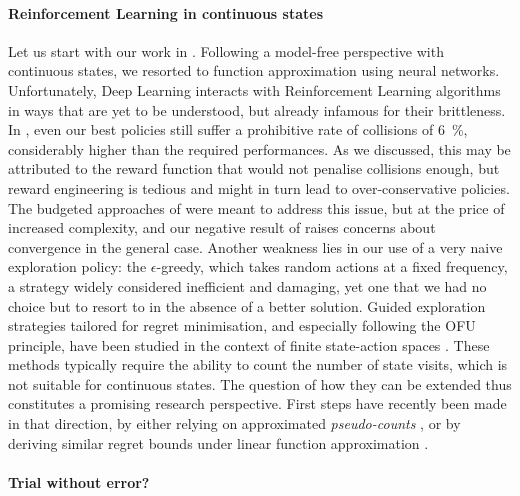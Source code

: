 \paragraph{Reinforcement Learning in continuous states}

Let us start with our work in . Following a model-free perspective with continuous states, we resorted to function approximation using neural networks. Unfortunately, Deep Learning interacts with Reinforcement Learning algorithms in ways that are yet to be understood, but already infamous for their brittleness. In , even our best policies still suffer a prohibitive rate of collisions of \SI{6}{\percent}, considerably higher than the required performances. 
As we discussed, this may be attributed to the reward function that would not penalise collisions enough, but reward engineering is tedious and might in turn lead to over-conservative policies. The budgeted approaches of  were meant to address this issue, but at the price of increased complexity, and our negative result of  raises concerns about convergence in the general case. 
Another weakness lies in our use of a very naive exploration policy: the $\epsilon$-greedy, which takes random actions at a fixed frequency, a strategy widely considered inefficient and damaging, yet one that we had no choice but to resort to in the absence of a better solution. Guided exploration strategies tailored for regret minimisation, and especially following the \gls{OFU} principle, have been studied in the context of finite state-action spaces \citep{Auer2009,Azar2017}. 
These methods typically require the ability to count the number of state visits, which is not suitable for continuous states. The question of how they can be extended thus constitutes a promising research perspective. First steps have recently been made in that direction, by either relying on approximated \emph{pseudo-counts} \citep{Guyon2017}, or by deriving similar regret bounds under linear function approximation \citep{Jin2020}.

\paragraph{Trial without error?}

